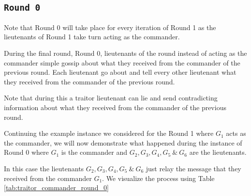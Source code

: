\documentclass[11pt]{article}
\newcommand{\gen}[1]{\ensuremath{G_{#1}}}
\begin{document}
\subsection*{\texttt{\large Round 0}}
Note that Round 0 will take place for every iteration of Round 1 as the lieutenants of Round 1 take turn acting as the commander.

During the final round, Round 0, lieutenants of the round instead of acting as the commander simple gossip about what they received from the commander of the previous round. Each lieutenant go about and tell every other lieutenant what they received from the commander of the previous round.

Note that during this a traitor lieutenant can lie and send contradicting information about what they received from the commander of the previous round.

Continuing the example instance we considered for the Round 1 where $\gen{1}$ acts as the commander, we will now demonstrate what happened during the instance of Round 0 where $\gen{1}$ is the commander and $\gen{2}, \gen{3}, \gen{4}, \gen{5} \  \& \ \gen{6}$ are the lieutenants.

In this case the lieutenants $\gen{2}, \gen{3}, \gen{4}, \gen{5} \  \& \ \gen{6}$ just relay the message that they received from the commander $\gen{1}$. We visualize the process using Table \ref{tab:traitor_commander_round_0}

\vspace{1em}
\end{document}
